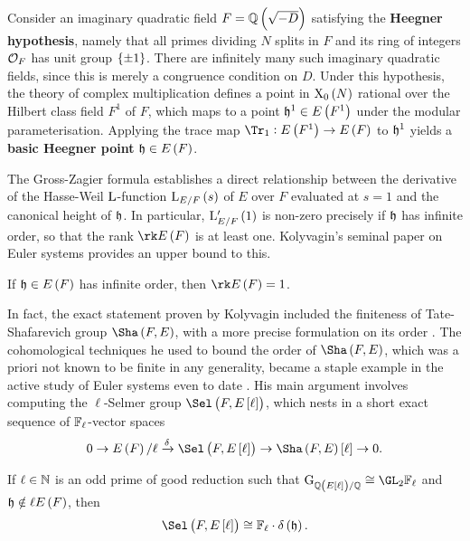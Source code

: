 Consider an imaginary quadratic field $ F = \QQ\br{\sqrt{-D}} $ satisfying the \textbf{Heegner hypothesis}, namely that all primes dividing $ N $ splits in $ F $ and its ring of integers $ \mathcal{O}_F $ has unit group $ \cbr{\pm 1} $. There are infinitely many such imaginary quadratic fields, since this is merely a congruence condition on $ D $. Under this hypothesis, the theory of complex multiplication defines a point in $ \X_0\br{N} $ rational over the Hilbert class field $ F^1 $ of $ F $, which maps to a point $ \hhh^1 \in E\br{F^1} $ under the modular parameterisation. Applying the trace map $ \Tr_1 : E\br{F^1} \to E\br{F} $ to $ \mathfrak{h}^1 $ yields a \textbf{basic Heegner point} $ \hhh \in E\br{F} $.

\pagebreak

The Gross-Zagier formula \cite{GZ86} establishes a direct relationship between the derivative of the Hasse-Weil $ \mathrm{L} $-function $ \L_{E / F}\br{s} $ of $ E $ over $ F $ evaluated at $ s = 1 $ and the canonical height of $ \mathfrak{h} $. In particular, $ \L'_{E / F}\br{1} $ is non-zero precisely if $ \mathfrak{h} $ has infinite order, so that the rank $ \rk E\br{F} $ is at least one. Kolyvagin's seminal paper on Euler systems \cite{Kol90} provides an upper bound to this.

\begin{theorem}
\label{thm:rankone}
If $ \hhh \in E\br{F} $ has infinite order, then $ \rk E\br{F} = 1 $.
\end{theorem}

In fact, the exact statement proven by Kolyvagin included the finiteness of Tate-Shafarevich group $ \Sha\br{F, E} $, with a more precise formulation on its order \cite[Theorem A]{Kol90}. The cohomological techniques he used to bound the order of $ \Sha\br{F, E} $, which was a priori not known to be finite in any generality, became a staple example in the active study of Euler systems even to date \cite{Rub00}. His main argument involves computing the $ \ell $-Selmer group $ \Sel\br{F, E\sbr{\ell}} $, which nests in a short exact sequence of $ \mathbb{F}_\ell $-vector spaces
$$ 0 \to E\br{F} / \ell \xrightarrow{\delta} \Sel\br{F, E\sbr{\ell}} \to \Sha\br{F, E}\sbr{\ell} \to 0. $$

\begin{theorem}
\label{thm:selmercyclic}
If $ \ell \in \mathbb{N} $ is an odd prime of good reduction such that $ \G_{\QQ\br{E\sbr{\ell}} / \QQ} \cong \GL_2 \FF_\ell $ and $ \hhh \notin \ell E\br{F} $, then
$$ \Sel\br{F, E\sbr{\ell}} \cong \FF_\ell \cdot \delta\br{\hhh}. $$
\end{theorem}

